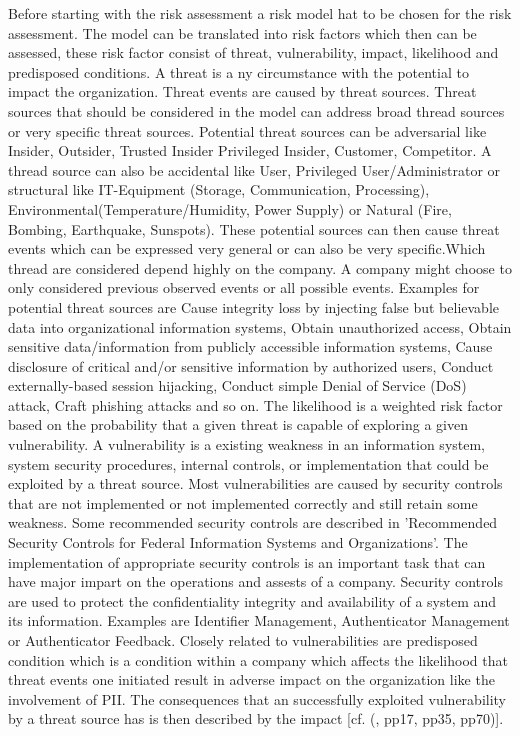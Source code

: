 Before starting with the risk assessment a risk model hat to be chosen for the risk assessment. The model can be translated into risk factors which then can be assessed, these risk factor consist of threat, vulnerability, impact, likelihood and predisposed conditions.  A threat is a ny circumstance with the potential to impact the organization. Threat events are caused by threat sources. Threat sources that should be considered in the model can address broad thread sources or very specific threat sources. Potential threat sources can be adversarial like Insider, Outsider, Trusted Insider Privileged Insider, Customer, Competitor. A thread source can also be accidental like User, Privileged User/Administrator or structural like IT-Equipment (Storage, Communication, Processing), Environmental(Temperature/Humidity, Power Supply) or Natural (Fire, Bombing, Earthquake, Sunspots). These potential sources can then cause threat events which can be expressed very general or can also be very specific.Which thread are considered depend highly on the company. A company might choose to only considered previous observed events or all possible events. Examples for potential threat sources are Cause integrity loss by injecting false but believable data into organizational information systems, Obtain unauthorized access, Obtain sensitive data/information from publicly accessible information systems, Cause disclosure of critical and/or sensitive information by authorized users, Conduct externally-based session hijacking, Conduct simple Denial of Service (DoS) attack, Craft phishing attacks and so on. The likelihood is a weighted risk factor based on the probability that a given threat is capable of exploring a given vulnerability. A vulnerability is a existing weakness in an information system, system security procedures, internal controls, or implementation that could be exploited by a threat source. Most vulnerabilities are caused by security controls that are not implemented or not implemented correctly and still retain some weakness. Some recommended security controls are described in 'Recommended Security Controls for Federal Information Systems and Organizations'. The implementation of appropriate security controls is an important task that can have major impart on the operations and assests of a company. Security controls are used to protect the confidentiality integrity and availability of a system and its information. Examples are Identifier Management, Authenticator Management or Authenticator Feedback. Closely related to vulnerabilities are predisposed condition which is a condition within a company which affects the likelihood that threat events one initiated result in adverse impact on the organization like the involvement of PII. The consequences that an successfully exploited vulnerability by a threat source has is then described by the impact  [cf. (\cite{NIST:2012:GCRA}, pp17, pp35, pp70)].

